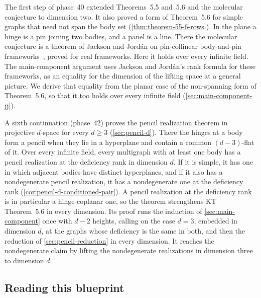 The first step of phase~40 extended Theorems~5.5 and~5.6 and the
molecular conjecture to dimension two. It also proved a form of
Theorem~5.6 for simple graphs that need not span the body set
(\cref{thm:theorem-55-6-rows}). In the plane a hinge is a pin joining two
bodies, and a panel is a line. There the molecular conjecture is a
theorem of Jackson and Jord\'an on pin-collinear body-and-pin
frameworks~\cite{jacksonJordan2008pin}, proved for real frameworks. Here
it holds over every infinite field. The main-component argument uses
Jackson and Jord\'an's rank formula for these frameworks, as an equality
for the dimension of the lifting space at a general picture. We derive
that equality from the planar case of the non-spanning form of
Theorem~5.6, so that it too holds over every infinite field
(\cref{sec:main-component-jj}).

A sixth continuation (phase~42) proves the pencil realization theorem in
projective $d$-space for every $d \ge 3$ (\cref{sec:pencil-d}). There the
hinges at a body form a pencil when they lie in a hyperplane and contain a
common $(d-3)$-flat of it. Over every infinite field, every multigraph
with at least one body has a pencil realization at the deficiency rank in
dimension $d$. If it is simple, it has one in which adjacent bodies have
distinct hyperplanes, and if it also has a nondegenerate pencil
realization, it has a nondegenerate one at the deficiency rank
(\cref{cor:pencil-d-conditioned-pair}). A pencil realization at the
deficiency rank is in particular a hinge-coplanar one, so the theorem
strengthens KT Theorem~5.6 in every dimension. Its proof runs the
induction of \cref{sec:main-component} once with $d - 2$ heights, calling
on the case $d = 3$, embedded in dimension $d$, at the graphs whose
deficiency is the same in both, and then the reduction of
\cref{sec:pencil-reduction} in every dimension. It reaches the
nondegenerate claim by lifting the nondegenerate realizations in
dimension three to dimension $d$.

\subsection*{Reading this blueprint}

